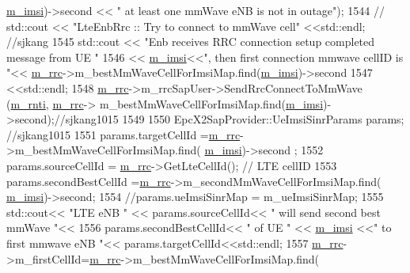 \begin{DoxyCode}
      \hyperlink{classns3_1_1UeManager_a868dda076ecfc1d4202e357c16223d84}{m\_imsi})->second << \textcolor{stringliteral}{" at least one mmWave eNB is not in outage"});
1544          \textcolor{comment}{// std::cout << "LteEnbRrc :: Try to connect to mmWave cell" <<std::endl; //sjkang}
1545           std::cout << \textcolor{stringliteral}{"Enb receives RRC connection setup completed message from UE "}
1546                           << \hyperlink{classns3_1_1UeManager_a868dda076ecfc1d4202e357c16223d84}{m\_imsi}<<\textcolor{stringliteral}{", then first connection mmwave cellID is "}<< 
      \hyperlink{classns3_1_1UeManager_ab4405e9f354c66e7c1a4c95832290f5b}{m\_rrc}->m\_bestMmWaveCellForImsiMap.find(\hyperlink{classns3_1_1UeManager_a868dda076ecfc1d4202e357c16223d84}{m\_imsi})->second
1547                           <<std::endl;
1548           \hyperlink{classns3_1_1UeManager_ab4405e9f354c66e7c1a4c95832290f5b}{m\_rrc}->m\_rrcSapUser->SendRrcConnectToMmWave (\hyperlink{classns3_1_1UeManager_a5a72b4fe818f21993bd7f05d7e2c4f83}{m\_rnti}, \hyperlink{classns3_1_1UeManager_ab4405e9f354c66e7c1a4c95832290f5b}{m\_rrc}->
      m\_bestMmWaveCellForImsiMap.find(\hyperlink{classns3_1_1UeManager_a868dda076ecfc1d4202e357c16223d84}{m\_imsi})->second);\textcolor{comment}{//sjkang1015}
1549 
1550           EpcX2SapProvider::UeImsiSinrParams params; \textcolor{comment}{//sjkang1015}
1551               params.targetCellId =\hyperlink{classns3_1_1UeManager_ab4405e9f354c66e7c1a4c95832290f5b}{m\_rrc}->m\_bestMmWaveCellForImsiMap.find(
      \hyperlink{classns3_1_1UeManager_a868dda076ecfc1d4202e357c16223d84}{m\_imsi})->second ; 
1552               params.sourceCellId = \hyperlink{classns3_1_1UeManager_ab4405e9f354c66e7c1a4c95832290f5b}{m\_rrc}->GetLteCellId(); \textcolor{comment}{// LTE cellID}
1553               params.secondBestCellId =\hyperlink{classns3_1_1UeManager_ab4405e9f354c66e7c1a4c95832290f5b}{m\_rrc}->m\_secondMmWaveCellForImsiMap.find(
      \hyperlink{classns3_1_1UeManager_a868dda076ecfc1d4202e357c16223d84}{m\_imsi})->second;
1554               \textcolor{comment}{//params.ueImsiSinrMap = m\_ueImsiSinrMap;}
1555               std::cout<< \textcolor{stringliteral}{"LTE eNB "} << params.sourceCellId<< \textcolor{stringliteral}{" will send  second best mmWave "}<<
1556                           params.secondBestCellId<< \textcolor{stringliteral}{" of UE "} << \hyperlink{classns3_1_1UeManager_a868dda076ecfc1d4202e357c16223d84}{m\_imsi} <<\textcolor{stringliteral}{" to first mmwave eNB "}<<
      params.targetCellId<<std::endl;
1557               \hyperlink{classns3_1_1UeManager_ab4405e9f354c66e7c1a4c95832290f5b}{m\_rrc}->m\_firstCellId=\hyperlink{classns3_1_1UeManager_ab4405e9f354c66e7c1a4c95832290f5b}{m\_rrc}->m\_bestMmWaveCellForImsiMap.find(

\end{DoxyCode}

